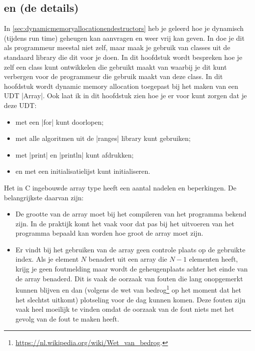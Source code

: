 \begin{cpplstShortInline}
\chapter{ en  (de details)}
\label{sec:dynamicmemoryallocationendestructorsdetails}
In \cref{sec:dynamicmemoryallocationendestructors} heb je geleerd hoe je dynamisch (tijdens run time) geheugen kan aanvragen en weer vrij kan geven.
In \Cpp{} doe je dit als programmeur meestal niet zelf, maar maak je gebruik van classes uit de standaard library die dit voor je doen.
In dit hoofdstuk wordt bespreken hoe je zelf een class kunt ontwikkelen die gebruikt maakt van  waarbij je dit kunt verbergen voor de programmeur die gebruik maakt van deze class. 
In dit hoofdstuk wordt dynamic memory allocation toegepast bij het maken van een UDT |Array|. 
Ook laat ik in dit hoofdstuk zien hoe je er voor kunt zorgen dat je deze UDT:
\begin{itemize}
	\item met een  |for| kunt doorlopen;
	\item met alle algoritmen uit de |ranges| library kunt gebruiken;
	\item met |print| en |println| kunt afdrukken;
	\item en met een initialisatielijst kunt initialiseren.
\end{itemize}

Het in C ingebouwde array type heeft een aantal nadelen en beperkingen.
De belangrijkste daarvan zijn:
\begin{itemize}
    \item De grootte van de array moet bij het compileren van het programma bekend zijn.
    In de praktijk komt het vaak voor dat pas bij het uitvoeren van het programma bepaald kan worden hoe groot de array moet zijn.
    \item Er vindt bij het gebruiken van de array geen controle plaats op de gebruikte index.
    Als je element $N$ benadert uit een array die $N-1$ elementen heeft, krijg je geen foutmelding maar wordt de geheugenplaats achter het einde van de array benaderd.
    Dit is vaak de oorzaak van fouten die lang onopgemerkt kunnen blijven en dan (volgens de wet van bedrog\footnote{%
		\url{https://nl.wikipedia.org/wiki/Wet_van_bedrog}.
	} op het moment dat het het slechtst uitkomt) plotseling voor de dag kunnen komen.
    Deze fouten zijn vaak heel moeilijk te vinden omdat de oorzaak van de fout niets met het gevolg van de fout te maken heeft.
\end{itemize}


\end{cpplstShortInline}
